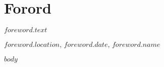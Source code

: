 \documentclass[11pt, a4paper]{article}
\begin{document}
\clearpage
\doublespacing
\tableofcontents
{}
\singlespacing
\clearpage

\section{Forord}

\normalsize
$foreword.text$\par
\medskip
$foreword.location$, $foreword.date$, $foreword.name$



\clearpage
\setcounter{secnumdepth}{1}


$body$


\end{document}
